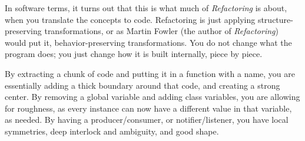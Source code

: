 In software terms, it turns out that this is what much of \textit{Refactoring}
is about, when you translate the concepts to code. Refactoring is just applying
structure-preserving transformations, or as Martin Fowler (the author of
\textit{Refactoring}) would put it, behavior-preserving transformations. You do
not change what the program does; you just change how it is built internally,
piece by piece.

By extracting a chunk of code and putting it in a function with a name, you are
essentially adding a thick boundary around that code, and creating a strong
center. By removing a global variable and adding class variables, you are
allowing for roughness, as every instance can now have a different value in that
variable, as needed. By having a producer/consumer, or notifier/listener, you
have local symmetries, deep interlock and ambiguity, and good shape.


